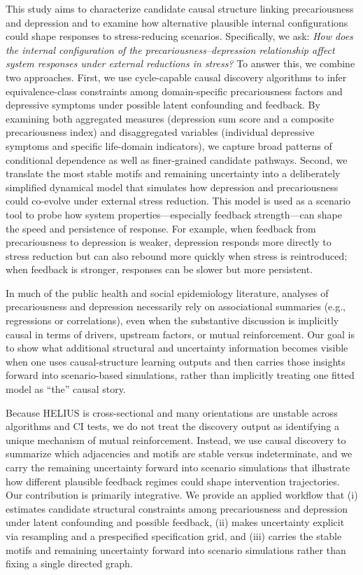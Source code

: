 \documentclass[
]{article}
\begin{document}
\textcolor{BrickRed}{This study aims to characterize candidate causal structure linking precariousness and depression and to examine how alternative plausible internal configurations could shape responses to stress-reducing scenarios. Specifically, we ask: \textit{How does the internal configuration of the precariousness–depression relationship affect system responses under external reductions in stress?}
To answer this, we combine two approaches. First, we use cycle-capable causal discovery algorithms to infer equivalence-class constraints among domain-specific precariousness factors and depressive symptoms under possible latent confounding and feedback.
By examining both aggregated measures (depression sum score and a composite precariousness index) and disaggregated variables (individual depressive symptoms and specific life-domain indicators), we capture broad patterns of conditional dependence as well as finer-grained candidate pathways.
Second, we translate the most stable motifs and remaining uncertainty into a deliberately simplified dynamical model that simulates how depression and precariousness could co-evolve under external stress reduction.
This model is used as a scenario tool to probe how system properties—especially feedback strength—can shape the speed and persistence of response. For example, when feedback from precariousness to depression is weaker, depression responds more directly to stress reduction but can also rebound more quickly when stress is reintroduced; when feedback is stronger, responses can be slower but more persistent.}

\textcolor{BrickRed}{In much of the public health and social epidemiology literature, analyses of precariousness and depression necessarily rely on associational summaries (e.g., regressions or correlations), even when the substantive discussion is implicitly causal in terms of drivers, upstream factors, or mutual reinforcement. Our goal is to show what additional structural and uncertainty information becomes visible when one uses causal-structure learning outputs and then carries those insights forward into scenario-based simulations, rather than implicitly treating one fitted model as “the” causal story.}

\textcolor{BrickRed}{Because HELIUS is cross-sectional and many orientations are unstable across algorithms and CI tests, we do not treat the discovery output as identifying a unique mechanism of mutual reinforcement. Instead, we use causal discovery to summarize which adjacencies and motifs are stable versus indeterminate, and we carry the remaining uncertainty forward into scenario simulations that illustrate how different plausible feedback regimes could shape intervention trajectories.}
\textcolor{BrickRed}{Our contribution is primarily integrative. We provide an applied workflow that (i) estimates candidate structural constraints among precariousness and depression under latent confounding and possible feedback, (ii) makes uncertainty explicit via resampling and a prespecified specification grid, and (iii) carries the stable motifs and remaining uncertainty forward into scenario simulations rather than fixing a single directed graph.}
\end{document}
